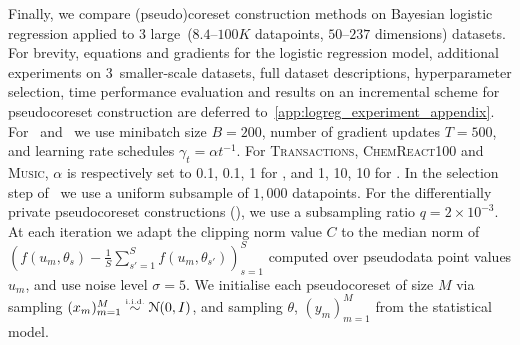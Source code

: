 Finally, we compare (pseudo)coreset construction methods on Bayesian logistic
regression applied to 3 large~($8.4$--$100K$ datapoints, $50$--$237$
dimensions) datasets. For brevity, equations and gradients for the logistic
regression model, additional experiments on \mbox{3 smaller-scale} datasets,
full dataset descriptions, hyperparameter selection, time performance
evaluation and results on an incremental scheme for pseudocoreset construction
are deferred to~\cref{app:logreg_experiment_appendix}. 
%
%
 For \psvi~and \sparsevi~we use minibatch size ${B=200}$, number of gradient
updates ${T=500}$, and learning rate schedules $ \gamma_t = \alpha t^{-1}$. For
\textsc{Transactions}, \textsc{ChemReact100} and \textsc{Music}, $\alpha$ is
respectively set to 0.1, 0.1, 1 for \sparsevi, and 1, 10, 10 for \psvi. In the
selection step of \sparsevi~we use a uniform subsample of $1,000$ datapoints.
For the differentially private pseudocoreset constructions (\dpsvi), we  use a
subsampling ratio $q=2\times10^{-3}$. At each iteration we adapt the clipping
norm value $ C $ to the median norm of $( f(u_m, \theta_s) - \frac{1}{S}
\sum_{s'=1}^{S} f(u_m, \theta_{s'}))_{s=1}^{S}$ computed
over pseudodata point values $u_m$, and use noise level $\sigma=5$. We
initialise each pseudocoreset of size $ M$ via sampling $(x_m)_{m=1}^{M} \distiid
\distNorm{(0, I)}$, and sampling $\theta$, $ (y_m)_{m=1}^{M} $ from the statistical
model.

